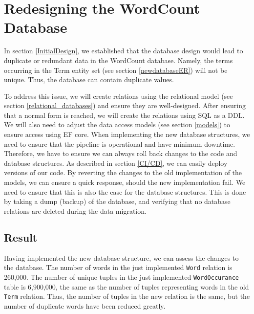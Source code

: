 \section{Redesigning the WordCount Database}
In section \ref{InitialDesign}, we established that the database design would lead to duplicate or redundant data in the WordCount database.
Namely, the terms occurring in the Term entity set (see section \ref{newdatabaseER}) will not be unique. 
Thus, the database can contain duplicate values.
 
To address this issue, we will create relations using the relational model (see section \ref{relational_databases}) and ensure they are well-designed.
After ensuring that a normal form is reached, we will create the relations using SQL as a DDL.
We will also need to adjust the data access models (see section \ref{models}) to ensure access using EF core.
When implementing the new database structures, we need to ensure that the pipeline is operational and have minimum downtime. 
Therefore, we have to ensure we can always roll back changes to the code and database structures.
As described in section \ref{CI/CD}, we can easily deploy versions of our code.
By reverting the changes to the old implementation of the models, we can ensure a quick response, should the new implementation fail.
We need to ensure that this is also the case for the database structures.
This is done by taking a dump (backup) of the database, and verifying that no database relations are deleted during the data migration.




\subsection{Result}
Having implemented the new database structure, we can assess the changes to the database. 
The number of words in the just implemented \texttt{Word} relation is 260,000.
The number of unique tuples in the just implemented \texttt{WordOccurance} table is 6,900,000, the same as the number of tuples representing words in the old \texttt{Term} relation.
Thus, the number of tuples in the new relation is the same, but the number of duplicate words have been reduced greatly.

